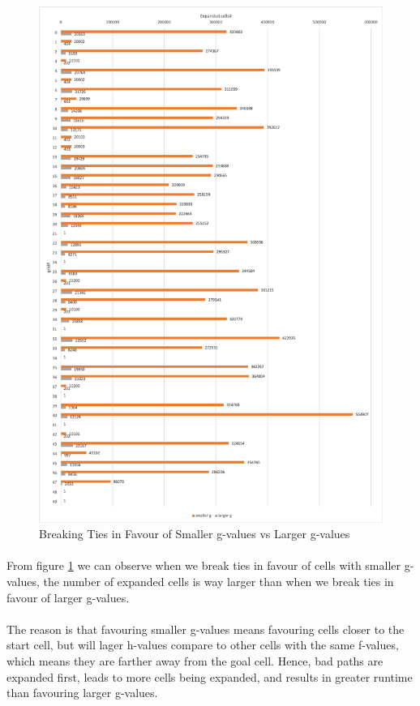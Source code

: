 \documentclass{article}
\begin{document}
\begin{figure}
\centering
\includegraphics[scale=0.47]{part2}
\caption{Breaking Ties in Favour of Smaller g-values vs Larger g-values}
\label{part2}
\end{figure}

\paragraph*{}
From figure \ref{part2} we can observe when we break ties in favour of cells with smaller g-values, the number of expanded cells is way larger than when we break ties in favour of larger g-values.

\paragraph*{}
The reason is that favouring smaller g-values means favouring cells closer to the start cell, but will lager h-values compare to other cells with the same f-values, which means they are farther away from the goal cell. Hence, bad paths are expanded first, leads to more cells being expanded, and results in greater runtime than favouring larger g-values.
\end{document}
